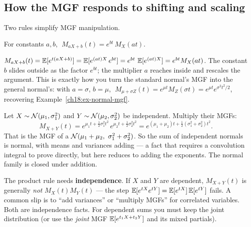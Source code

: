 \subsection{How the MGF responds to shifting and scaling}

Two rules simplify MGF manipulation.

\begin{proposition}
\label{ch18:prop-affine}
For constants $a,b$, $\;M_{aX+b}(t) = e^{bt}\,M_X(at).$
\end{proposition}

\begin{whybox}
$M_{aX+b}(t)=\operatorname{\mathbb{E}}[e^{t(aX+b)}]=\operatorname{\mathbb{E}}[e^{(at)X}\,e^{bt}] = e^{bt}\,\operatorname{\mathbb{E}}[e^{(at)X}] =
e^{bt}M_X(at)$. The constant $b$ slides outside as the factor $e^{bt}$; the
multiplier $a$ reaches inside and rescales the argument. This is exactly how you
turn the standard normal's MGF into the general normal's: with $a=\sigma$,
$b=\mu$, $\;M_{\mu+\sigma Z}(t)=e^{\mu t}M_Z(\sigma t)=e^{\mu t}e^{\sigma^2
t^2/2}$, recovering Example~\ref{ch18:ex-normal-mgf}.
\end{whybox}

\begin{example}
\label{ch18:ex-normal-sum}
Let $X\sim\mathcal{N}(\mu_1,\sigma_1^2)$ and $Y\sim\mathcal{N}(\mu_2,\sigma_2^2)$ be
independent. Multiply their MGFs:
\[
  M_{X+Y}(t)=e^{\mu_1 t+\frac12\sigma_1^2 t^2}\,
             e^{\mu_2 t+\frac12\sigma_2^2 t^2}
            =e^{(\mu_1+\mu_2)t+\frac12(\sigma_1^2+\sigma_2^2)t^2}.
\]
That is the MGF of a $\Normal(\mu_1+\mu_2,\ \sigma_1^2+\sigma_2^2)$. So the sum
of independent normals is normal, with means and variances adding --- a fact
that requires a convolution integral to prove directly, but here reduces to
adding the exponents. The normal family is closed under addition.
\end{example}

\begin{trapbox}
The product rule needs \textbf{independence}. If $X$ and $Y$ are dependent,
$M_{X+Y}(t)$ is generally \emph{not} $M_X(t)M_Y(t)$ --- the step
$\operatorname{\mathbb{E}}[e^{tX}e^{tY}]=\operatorname{\mathbb{E}}[e^{tX}]\operatorname{\mathbb{E}}[e^{tY}]$ fails. A common slip is to ``add
variances'' or ``multiply MGFs'' for correlated variables. Both are independence
facts. For dependent sums you must keep the joint distribution (or use the
\emph{joint} MGF $\operatorname{\mathbb{E}}[e^{t_1 X + t_2 Y}]$ and its mixed partials).
\end{trapbox}

